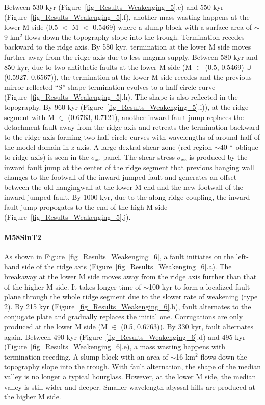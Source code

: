 \documentclass[draft,gc]{agutex}
\begin{document}
\begin{article}
Between 530 kyr (Figure~\ref{fig_Results_Weakenging_5}.e) and 550 kyr (Figure~\ref{fig_Results_Weakenging_5}.f), another mass wasting happens at the lower M side (0.5 $<$ M $<$ 0.5469) where a slump block with a surface area of $\sim$9 km$^{2}$ flows down the topography slope into the trough. Termination recedes backward to the ridge axis. By 580 kyr, termination at the lower M side moves further away from the ridge axis due to less magma supply. Between 580 kyr and 850 kyr, due to two antithetic faults at the lower M side (M $\in$ (0.5, 0.5469) $\cup$ (0.5927, 0.6567)), the termination at the lower M side recedes and the previous mirror reflected ``S'' shape termination evolves to a half circle curve (Figure~\ref{fig_Results_Weakenging_5}.h). The shape is also reflected in the topography. By 960 kyr (Figure~\ref{fig_Results_Weakenging_5}.i)), at the ridge segment with M $\in$ (0.6763, 0.7121), another inward fault jump replaces the detachment fault away from the ridge axis and retreats the termination backward to the ridge axis forming two half circle curves with wavelengths of around half of the model domain in $z$-axis. A large dextral shear zone (red region $\sim$40 $\degree$ oblique to ridge axis) is seen in the $\sigma_{xz}$ panel. The shear stress $\sigma_{xz}$ is produced by the inward fault jump at the center of the ridge segment that previous hanging wall changes to the footwall of the inward jumped fault and generates an offset between the old hangingwall at the lower M end and the new footwall of the inward jumped fault. By 1000 kyr, due to the along ridge coupling, the inward fault jump propogates to the end of the high M side (Figure~\ref{fig_Results_Weakenging_5}.j). 

\paragraph{M58SinT2}\label{para_M58SinT2}
As shown in Figure~\ref{fig_Results_Weakenging_6}, a fault initiates on the left-hand side of the ridge axis (Figure~\ref{fig_Results_Weakenging_6}.a). The breakaway at the lower M side moves away from the ridge axis further than that of the higher M side. It takes longer time of $\sim$100 kyr to form a localized fault plane through the whole ridge segment due to the slower rate of weakening (type 2). By 215 kyr (Figure~\ref{fig_Results_Weakenging_6}.b), fault alternates to the conjugate plate and gradually replaces the initial one. Corrugations are only produced at the lower M side (M $\in$ (0.5, 0.6763)). By 330 kyr, fault alternates again. Between 490 kyr (Figure~\ref{fig_Results_Weakenging_6}.d) and 495 kyr (Figure~\ref{fig_Results_Weakenging_6}.e), a mass wasting happens with termination receding. A slump block with an area of $\sim$16 km$^{2}$ flows down the topography slope into the trough. With fault alternation, the shape of the median valley is no longer a typical hourglass. However, at the lower M side, the median valley is still wider and deeper. Smaller wavelength abyssal hills are produced at the higher M side. 


\end{article}
\end{document}
